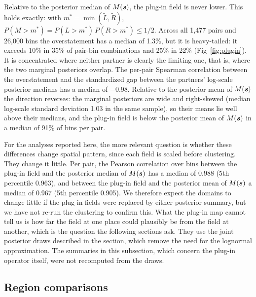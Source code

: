 \documentclass[10pt,letterpaper]{article}
\begin{document}
Relative to the posterior median of $M(\mbox{\boldmath $s$})$, the plug-in field is never lower. This holds exactly: with $m^* = \min(\tilde{L}, \tilde{R})$, $P(M > m^*) = P(L > m^*)\,P(R > m^*) \le 1/2$. Across all 1,477 pairs and 26,000 bins the overstatement has a median of 1.3\%, but it is heavy-tailed: it exceeds 10\% in 35\% of pair-bin combinations and 25\% in 22\% (Fig~\ref{fig:plugin}). It is concentrated where neither partner is clearly the limiting one, that is, where the two marginal posteriors overlap. The per-pair Spearman correlation between the overstatement and the standardized gap between the partners' log-scale posterior medians has a median of $-0.98$. Relative to the posterior mean of $M(\mbox{\boldmath $s$})$ the direction reverses: the marginal posteriors are wide and right-skewed (median log-scale standard deviation 1.03 in the same sample), so their means lie well above their medians, and the plug-in field is below the posterior mean of $M(\mbox{\boldmath $s$})$ in a median of 91\% of bins per pair.

For the analyses reported here, the more relevant question is whether these differences change spatial pattern, since each field is scaled before clustering. They change it little. Per pair, the Pearson correlation over bins between the plug-in field and the posterior median of $M(\mbox{\boldmath $s$})$ has a median of 0.988 (5th percentile 0.963), and between the plug-in field and the posterior mean of $M(\mbox{\boldmath $s$})$ a median of 0.967 (5th percentile 0.905). We therefore expect the domains to change little if the plug-in fields were replaced by either posterior summary, but we have not re-run the clustering to confirm this. What the plug-in map cannot tell us is how far the field at one place could plausibly be from the field at another, which is the question the following sections ask. They use the joint posterior draws described in the  section, which remove the need for the lognormal approximation. The summaries in this subsection, which concern the plug-in operator itself, were not recomputed from the draws.

\subsection*{Region comparisons}
\label{sec:res-regions}
\end{document}
